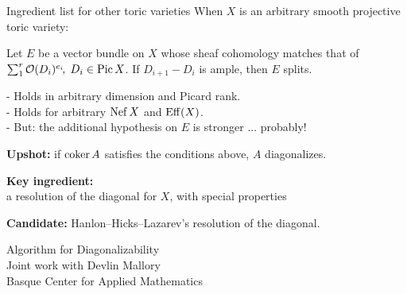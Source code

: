 \documentclass[beamer]{paper}
\begin{document}
\begin{frame}[t]{Ingredient list for other toric varieties}
  When $X$ is an arbitrary smooth projective toric variety:
  \begin{theorem}[S. '24]
    Let $E$ be a vector bundle on $X$ whose sheaf cohomology matches that of
    \( \sum_{1}^r \mathcal{O}(D_i)^{e_i}\!, \) $D_i\in\operatorname{Pic}X$\!.
    {\color{rossred}If $D_{i+1}\!-\!D_i$ is ample}, then $E$ splits.
  \end{theorem}
  \pause
  - Holds in {\color{rossgreen}arbitrary} dimension and Picard rank. \\
  - Holds for {\color{rossgreen}arbitrary} $\operatorname{Nef}X$ and $\operatorname{Eff}(X)$. \\ \pause
  - But: the additional hypothesis on $E$ is stronger \pause ... probably!

  \vfill
  \pause
  \textbf{\color{rossred} Upshot:} if $\operatorname{coker} A$ satisfies the conditions above, $A$ diagonalizes.

  \vfill
  \pause
  \begin{exampleblock}{}
    \textbf{Key ingredient:} \\
    \centering
    a resolution of the diagonal for $X$, with special properties %
  \end{exampleblock}
  
  \pause
  \textbf{Candidate:} Hanlon--Hicks--Lazarev's resolution of the diagonal.%
\end{frame}


\begin{frame}
  \centering
  \LARGE Algorithm for Diagonalizability \\[1em]
  \footnotesize Joint work with Devlin Mallory \\
  Basque Center for Applied Mathematics
\end{frame}
\end{document}
